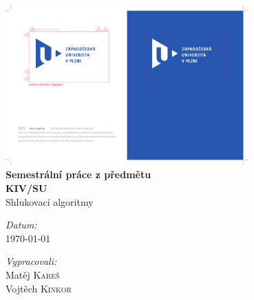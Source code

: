 \begin{titlepage}
\begin{center}


~\\[2.5cm]
\includegraphics[width=0.7\textwidth]{res/logo}
\\[0.5cm]


{ \huge \bf Semestrální práce z předmětu\\ KIV/SU \\[0.6cm] }
{ \LARGE \sc Shlukovací algoritmy }

\vfill

\begin{minipage}{0.49\textwidth}
\begin{flushleft} 
\emph{Datum:}\\
\today
\end{flushleft}
\end{minipage}
\begin{minipage}{0.49\textwidth}
\begin{flushright} 
\emph{Vypracovali:} \\
Matěj \textsc{Kareš}\\
Vojtěch \textsc{Kinkor}
\end{flushright}
\end{minipage}



\end{center}
\end{titlepage}